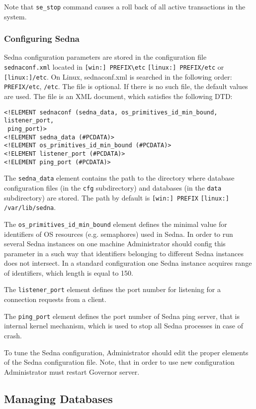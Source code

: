\documentclass[a4paper,12pt]{article}
\begin{document}
Note that \verb!se_stop! command causes a roll back of all active transactions in the system.

\subsubsection{Configuring Sedna}
\label{sec:ConfigSedna}
Sedna configuration parameters are stored in the configuration file \verb!sednaconf.xml! located in
\verb![win:] PREFIX\etc! \verb![linux:] PREFIX/etc! or \verb![linux:]/etc!. On Linux, sednaconf.xml is searched in the following order: \verb!PREFIX/etc!, \verb!/etc!. The file is optional. If there is no such file, the default values are used.
The file is an XML document, which satisfies the following DTD:

\begin{verbatim}
<!ELEMENT sednaconf (sedna_data, os_primitives_id_min_bound, listener_port,
 ping_port)>
<!ELEMENT sedna_data (#PCDATA)>
<!ELEMENT os_primitives_id_min_bound (#PCDATA)>
<!ELEMENT listener_port (#PCDATA)>
<!ELEMENT ping_port (#PCDATA)>
\end{verbatim}

The \verb!sedna_data! element contains the path to the directory where 
database configuration files (in the \verb!cfg! subdirectory) and 
databases (in the \verb!data! subdirectory) are stored. The path by default is
\verb![win:] PREFIX! \verb![linux:] /var/lib/sedna!.

The \verb!os_primitives_id_min_bound! element defines the minimal value for identifiers of OS resources (e.g. semaphores) used in Sedna. In order to run several Sedna instances on one machine Administrator should config this parameter in a such way that identifiers belonging to different Sedna instances does not intersect. In a standard configuration one Sedna instance acquires range of identifiers, which length is equal to 150.

The \verb!listener_port! element defines the port number for listening for a connection requests from a client.

The \verb!ping_port! element defines the port number of Sedna ping server, that is internal kernel mechanism, which is used to stop all Sedna processes in case of crash. 
 
To tune the Sedna configuration, Administrator should edit the proper elements of the Sedna configuration file. Note, that in order to use new configuration Administrator must restart Governor server.

\subsection{Managing Databases}
\end{document}
